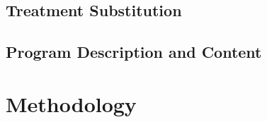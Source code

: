 \noindent 


\subsection{Treatment Substitution}

\subsection{Program Description and Content}

\section{Methodology} \label{section:methodology}

\clearpage
\singlespace



 